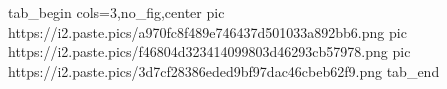  
 
 
 
 
\zzSecCmtScr


\ifcmt
  tab_begin cols=3,no_fig,center
     pic https://i2.paste.pics/a970fc8f489e746437d501033a892bb6.png
		 pic https://i2.paste.pics/f46804d323414099803d46293cb57978.png
		 pic https://i2.paste.pics/3d7cf28386eded9bf97dac46cbeb62f9.png
  tab_end
\fi

